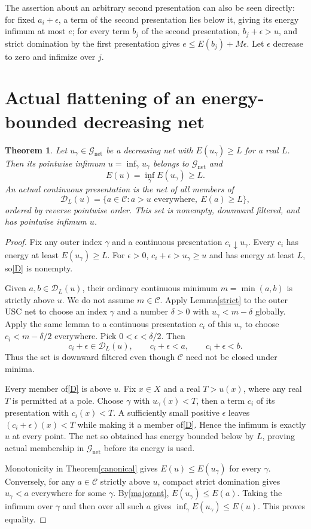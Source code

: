 \documentclass[11pt]{article}
\newcommand{\C}{\mathcal C}
\newcommand{\GN}{\mathcal G_{\mathrm{net}}}
\newtheorem{theorem}{Theorem}
\theoremstyle{remark}\newtheorem{remark}[theorem]{Remark}
\begin{document}
The assertion about an arbitrary second presentation can also be
seen directly: for fixed $a_i+\epsilon$, a term of the second
presentation lies below it, giving its energy infimum at most
$e$; for every term $b_j$ of the second presentation,
$b_j+\epsilon>u$, and strict domination by the first presentation
gives $e\le E(b_j)+M\epsilon$. Let $\epsilon$ decrease to zero
and infimize over $j$.

\section{Actual flattening of an energy-bounded decreasing net}
\begin{theorem}\label{netflat}
Let $u_\gamma\in\GN$ be a decreasing net with
$E(u_\gamma)\ge L$ for a real $L$. Then its pointwise infimum
$u=\inf_\gamma u_\gamma$ belongs to $\GN$ and
\[
 E(u)=\inf_\gamma E(u_\gamma)\ge L.
\]
An actual continuous presentation is the net of all members of
\begin{equation}\label{D}
 \mathscr D_L(u)=\{a\in\C:a>u\text{ everywhere},\ E(a)\ge L\},
\end{equation}
ordered by reverse pointwise order. This set is nonempty,
downward filtered, and has pointwise infimum $u$.
\end{theorem}
\begin{proof}
Fix any outer index $\gamma$ and a continuous presentation
$c_i\downarrow u_\gamma$. Every $c_i$ has energy at least
$E(u_\gamma)\ge L$. For $\epsilon>0$, $c_i+\epsilon>u_\gamma\ge u$
and has energy at least $L$, so\eqref{D} is nonempty.

Given $a,b\in\mathscr D_L(u)$, their ordinary continuous minimum
$m=\min(a,b)$ is strictly above $u$. We do not assume $m\in\C$.
Apply Lemma\ref{strict} to the outer USC net to choose an index
$\gamma$ and a number $\delta>0$ with $u_\gamma<m-\delta$ globally.
Apply the same lemma to a continuous presentation $c_i$ of this
$u_\gamma$ to choose $c_i<m-\delta/2$ everywhere. Pick
$0<\epsilon<\delta/2$. Then
\[
 c_i+\epsilon\in\mathscr D_L(u),\qquad
 c_i+\epsilon<a,\qquad c_i+\epsilon<b.
\]
Thus the set is downward filtered even though $\C$ need not be
closed under minima.

Every member of\eqref{D} is above $u$. Fix $x\in X$ and a real
$T>u(x)$, where any real $T$ is permitted at a pole. Choose
$\gamma$ with $u_\gamma(x)<T$, then a term $c_i$ of its
presentation with $c_i(x)<T$. A sufficiently small positive
$\epsilon$ leaves $(c_i+\epsilon)(x)<T$ while making it a member
of\eqref{D}. Hence the infimum is exactly $u$ at every point.
The net so obtained has energy bounded below by $L$, proving
actual membership in $\GN$ before its energy is used.

Monotonicity in Theorem\ref{canonical} gives
$E(u)\le E(u_\gamma)$ for every $\gamma$. Conversely, for any
$a\in\C$ strictly above $u$, compact strict domination gives
$u_\gamma<a$ everywhere for some $\gamma$.
By\eqref{majorant}, $E(u_\gamma)\le E(a)$. Taking the infimum
over $\gamma$ and then over all such $a$ gives
$\inf_\gamma E(u_\gamma)\le E(u)$. This proves equality.
\end{proof}
\end{document}
